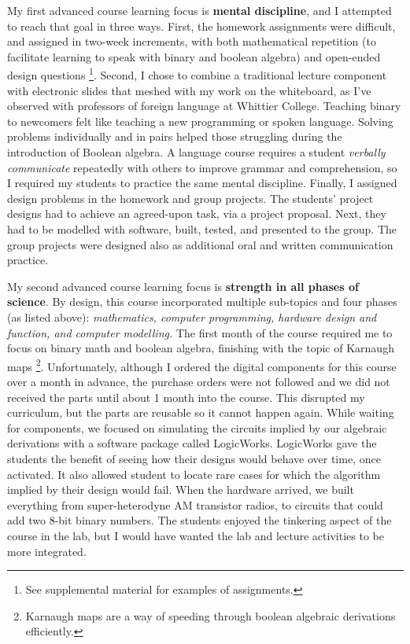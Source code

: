 \documentclass[../../../main.tex]{subfiles}
\begin{document}
My first advanced course learning focus is \textbf{mental discipline}, and I attempted to reach that goal in three ways.  First, the homework assignments were difficult, and assigned in two-week increments, with both mathematical repetition (to facilitate learning to speak with binary and boolean algebra) and open-ended design questions \footnote{See supplemental material for examples of assignments.}.  Second, I chose to combine a traditional lecture component with electronic slides that meshed with my work on the whiteboard, as I've observed with professors of foreign language at Whittier College.  Teaching binary to newcomers felt like teaching a new programming or spoken language.  Solving problems individually and in pairs helped those struggling during the introduction of Boolean algebra.  A language course requires a student \textit{verbally communicate} repeatedly with others to improve grammar and comprehension, so I required my students to practice the same mental discipline.  Finally, I assigned design problems in the homework and group projects.  The students' project designs had to achieve an agreed-upon task, via a project proposal.  Next, they had to be modelled with software, built, tested, and presented to the group.  The group projects were designed also as additional oral and written communication practice. \\ \hspace{0.1cm}

My second advanced course learning focus is \textbf{strength in all phases of science}.  By design, this course incorporated multiple sub-topics and four phases (as listed above): \textit{mathematics, computer programming, hardware design and function, and computer modelling.}  The first month of the course required me to focus on binary math and boolean algebra, finishing with the topic of Karnaugh maps \footnote{Karnaugh maps are a way of speeding through boolean algebraic derivations efficiently.}.  Unfortunately, although I ordered the digital components for this course over a month in advance, the purchase orders were not followed and we did not received the parts until about 1 month into the course.  This disrupted my curriculum, but the parts are reusable so it cannot happen again.  While waiting for components, we focused on simulating the circuits implied by our algebraic derivations with a software package called LogicWorks.  LogicWorks gave the students the benefit of seeing how their designs would behave over time, once activated.  It also allowed student to locate rare cases for which the algorithm implied by their design would fail.  When the hardware arrived, we built everything from super-heterodyne AM transistor radios, to circuits that could add two 8-bit binary numbers.  The students enjoyed the tinkering aspect of the course in the lab, but I would have wanted the lab and lecture activities to be more integrated. \\ \hspace{0.1cm}
\end{document}
